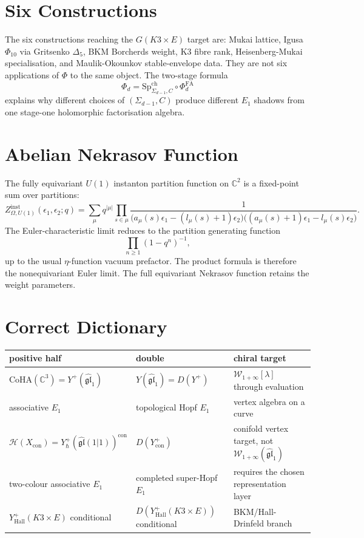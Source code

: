 \documentclass[11pt]{article}
\theoremstyle{definition}
\theoremstyle{remark}
\providecommand{\CoHA}{\mathrm{CoHA}}
\providecommand{\Winf}{\mathcal{W}_{1+\infty}}
\providecommand{\CC}{\mathbb{C}}
\providecommand{\gghone}{\widehat{\mathfrak{gl}}_1}
\providecommand{\cH}{\mathcal{H}}
\providecommand{\Eone}{E_1}
\providecommand{\PhiFA}{\Phi^{\mathrm{FA}}}
\providecommand{\SpCh}{\mathrm{Sp}^{\mathrm{ch}}}
\begin{document}
\section{Six Constructions}
\label{sec:six-routes}

The six constructions reaching the $G(K3\times E)$ target are:
Mukai lattice, Igusa $\Phi_{10}$ via Gritsenko $\Delta_5$, BKM
Borcherds weight, K3 fibre rank, Heisenberg-Mukai specialisation, and
Maulik-Okounkov stable-envelope data. They are not six applications of
$\Phi$ to the same object. The two-stage formula
\[
 \Phi_d=\SpCh_{\Sigma_{d-1},C}\circ\PhiFA_d
\]
explains why different choices of $(\Sigma_{d-1},C)$ produce different
$\Eone$ shadows from one stage-one holomorphic factorisation algebra.

\section{Abelian Nekrasov Function}
\label{sec:nekrasov}

The fully equivariant $U(1)$ instanton partition function on
$\CC^2$ is a fixed-point sum over partitions:
\[
 Z^{\mathrm{inst}}_{\Omega,U(1)}(\epsilon_1,\epsilon_2;q)
 =
 \sum_{\mu}q^{|\mu|}
 \prod_{s\in\mu}
 \frac{1}{
 \bigl(a_\mu(s)\epsilon_1-(l_\mu(s)+1)\epsilon_2\bigr)
 \bigl((a_\mu(s)+1)\epsilon_1-l_\mu(s)\epsilon_2\bigr)}.
\]
The Euler-characteristic limit reduces to the partition generating
function
\[
 \prod_{n\ge 1}(1-q^n)^{-1},
\]
up to the usual $\eta$-function vacuum prefactor. The product formula is
therefore the nonequivariant Euler limit. The full equivariant Nekrasov
function retains the weight parameters.

\section{Correct Dictionary}
\label{sec:dictionary}

\begin{center}
\small
\renewcommand{\arraystretch}{1.2}
\begin{tabular}{>{\raggedright\arraybackslash}p{}|>{\raggedright\arraybackslash}p{}|>{\raggedright\arraybackslash}p{}}
\textbf{positive half} & \textbf{double} & \textbf{chiral target}\\
\hline
$\CoHA(\CC^3)=Y^+(\gghone)$ &
$Y(\gghone)=D(Y^+)$ &
$\Winf[\lambda]$ through evaluation\\
associative $\Eone$ &
topological Hopf $\Eone$ &
vertex algebra on a curve\\[0.8ex]
$\cH(X_{\mathrm{con}})=Y^+_{\hbar}(\widehat{\mathfrak{gl}}(1|1))^{\mathrm{con}}$ &
$D(Y^+_{\mathrm{con}})$ &
conifold vertex target, not $\Winf(\gghone)$\\
two-colour associative $\Eone$ &
completed super-Hopf $\Eone$ &
requires the chosen representation layer\\[0.8ex]
$Y^+_{\mathrm{Hall}}(K3\times E)$ conditional &
$D(Y^+_{\mathrm{Hall}}(K3\times E))$ conditional &
BKM/Hall-Drinfeld branch\\
\end{tabular}
\end{center}
\end{document}
